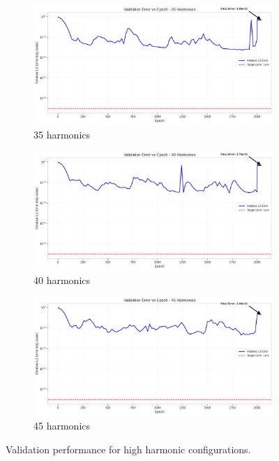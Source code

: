 \begin{figure}[H]
    \centering
    \begin{subfigure}[b]{0.32\textwidth}
        \centering
        \includegraphics[width=\textwidth]{figures/validation_error_35h.png}
        \caption{35 harmonics}
    \end{subfigure}
    \hfill
    \begin{subfigure}[b]{0.32\textwidth}
        \centering
        \includegraphics[width=\textwidth]{figures/validation_error_40h.png}
        \caption{40 harmonics}
    \end{subfigure}
    \hfill
    \begin{subfigure}[b]{0.32\textwidth}
        \centering
        \includegraphics[width=\textwidth]{figures/validation_error_45h.png}
        \caption{45 harmonics}
    \end{subfigure}
    \caption{Validation performance for high harmonic configurations.}
    \label{fig:validation_high}
\end{figure}

